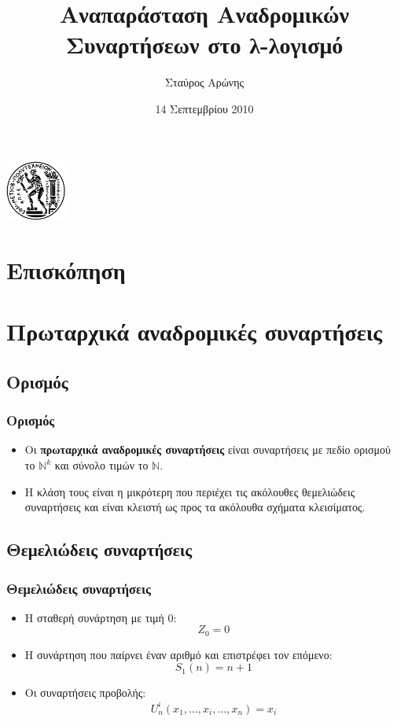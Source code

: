 \documentclass{beamer}
\title[Αναδρομικές Συναρτήσεις στο λ-λογισμό]{Αναπαράσταση Αναδρομικών Συναρτήσεων στο λ-λογισμό}
\author{Σταύρος Αρώνης}
\date{14 Σεπτεμβρίου 2010}
\institute{Εφαρμογές της λογικής στην Πληροφορική\\Σχολή ΗΜΜΥ, ΕΜΠ}
\begin{document}
\begin{frame}
        \titlepage
        \begin{center}
                \includegraphics[height=2cm]{pyrforos.png}
        \end{center}
\end{frame}

\section*{Επισκόπηση}

\begin{frame}
  \tableofcontents[hidesubsections]
\end{frame}

\section{Πρωταρχικά αναδρομικές συναρτήσεις}

\subsection{Ορισμός}

\begin{frame}
        \frametitle{Ορισμός}
        \begin{itemize}
                \item   Οι \textbf{πρωταρχικά αναδρομικές συναρτήσεις} 
                                είναι συναρτήσεις με πεδίο ορισμού το \( \mathbb{N}^k \) 
                                και σύνολο τιμών το \( \mathbb{N} \).
                \pause
                \item   Η κλάση τους είναι η μικρότερη που περιέχει τις ακόλουθες
                                θεμελιώδεις συναρτήσεις και είναι κλειστή ως προς τα ακόλουθα
                                σχήματα κλεισίματος.
        \end{itemize}
\end{frame}

\subsection{Θεμελιώδεις συναρτήσεις}

\begin{frame}
        \frametitle{Θεμελιώδεις συναρτήσεις}
        \begin{itemize}
                \item Η σταθερή συνάρτηση με τιμή 0: \[Z_0=0\]
                \pause
                \item Η συνάρτηση που παίρνει έναν αριθμό και επιστρέφει τον επόμενο: \[S_1(n)=n+1\]
                \pause
                \item Οι συναρτήσεις προβολής: \[U^i_n(x_1,\ldots,x_i,\ldots,x_n)=x_i\]
        \end{itemize}
\end{frame}
\end{document}
